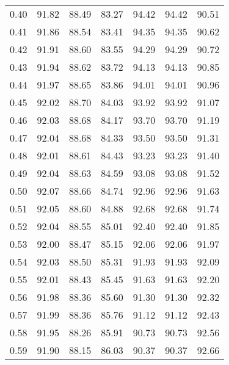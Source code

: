 \begin{tabular}{|c|c|c|c|c|c|c|}
      0.40 &     91.82 &     88.49 &      83.27 &   94.42 &      94.42 &         90.51 \\
      0.41 &     91.86 &     88.54 &      83.41 &   94.35 &      94.35 &         90.62 \\
      0.42 &     91.91 &     88.60 &      83.55 &   94.29 &      94.29 &         90.72 \\
      0.43 &     91.94 &     88.62 &      83.72 &   94.13 &      94.13 &         90.85 \\
      0.44 &     91.97 &     88.65 &      83.86 &   94.01 &      94.01 &         90.96 \\
      0.45 &     92.02 &     88.70 &      84.03 &   93.92 &      93.92 &         91.07 \\
      0.46 &     92.03 &     88.68 &      84.17 &   93.70 &      93.70 &         91.19 \\
      0.47 &     92.04 &     88.68 &      84.33 &   93.50 &      93.50 &         91.31 \\
      0.48 &     92.01 &     88.61 &      84.43 &   93.23 &      93.23 &         91.40 \\
      0.49 &     92.04 &     88.63 &      84.59 &   93.08 &      93.08 &         91.52 \\
      0.50 &     92.07 &     88.66 &      84.74 &   92.96 &      92.96 &         91.63 \\
      0.51 &     92.05 &     88.60 &      84.88 &   92.68 &      92.68 &         91.74 \\
      0.52 &     92.04 &     88.55 &      85.01 &   92.40 &      92.40 &         91.85 \\
      0.53 &     92.00 &     88.47 &      85.15 &   92.06 &      92.06 &         91.97 \\
      0.54 &     92.03 &     88.50 &      85.31 &   91.93 &      91.93 &         92.09 \\
      0.55 &     92.01 &     88.43 &      85.45 &   91.63 &      91.63 &         92.20 \\
      0.56 &     91.98 &     88.36 &      85.60 &   91.30 &      91.30 &         92.32 \\
      0.57 &     91.99 &     88.36 &      85.76 &   91.12 &      91.12 &         92.43 \\
      0.58 &     91.95 &     88.26 &      85.91 &   90.73 &      90.73 &         92.56 \\
      0.59 &     91.90 &     88.15 &      86.03 &   90.37 &      90.37 &         92.66 \\

\end{tabular}

